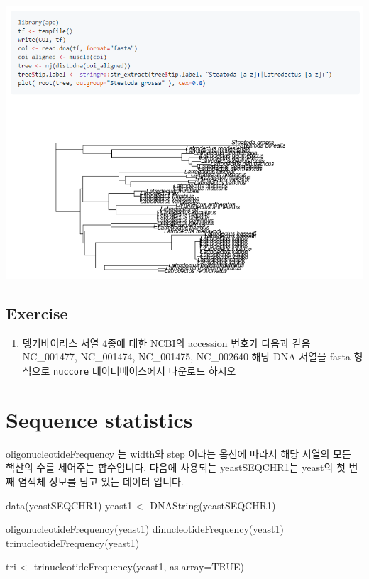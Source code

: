 \documentclass[
]{book}
\newenvironment{Shaded}{\begin{snugshade}}{\end{snugshade}}
\newcommand{\AttributeTok}[1]{\textcolor[rgb]{0.77,0.63,0.00}{#1}}
\newcommand{\ConstantTok}[1]{\textcolor[rgb]{0.00,0.00,0.00}{#1}}
\newcommand{\FunctionTok}[1]{\textcolor[rgb]{0.00,0.00,0.00}{#1}}
\newcommand{\NormalTok}[1]{#1}
\newcommand{\OtherTok}[1]{\textcolor[rgb]{0.56,0.35,0.01}{#1}}
\providecommand{\tightlist}{%
  \setlength{\itemsep}{0pt}\setlength{\parskip}{0pt}}
\begin{document}
\includegraphics{images/ape.PNG}

\hypertarget{exercise-7}{%
\subsection{Exercise}\label{exercise-7}}

\begin{enumerate}
\def\labelenumi{\arabic{enumi}.}
\tightlist
\item
  뎅기바이러스 서열 4종에 대한 NCBI의 accession 번호가 다음과 같음 NC\_001477, NC\_001474, NC\_001475, NC\_002640 해당 DNA 서열을 fasta 형식으로 \texttt{nuccore} 데이터베이스에서 다운로드 하시오
\end{enumerate}

\hypertarget{sequence-statistics}{%
\section{Sequence statistics}\label{sequence-statistics}}

oligonucleotideFrequency 는 width와 step 이라는 옵션에 따라서 해당 서열의 모든 핵산의 수를 세어주는 합수입니다. 다음에 사용되는 yeastSEQCHR1는 yeast의 첫 번째 염색체 정보를 담고 있는 데이터 입니다.

\begin{Shaded}
\begin{Highlighting}[]
\FunctionTok{data}\NormalTok{(yeastSEQCHR1)}
\NormalTok{yeast1 }\OtherTok{\textless{}{-}} \FunctionTok{DNAString}\NormalTok{(yeastSEQCHR1)}

\FunctionTok{oligonucleotideFrequency}\NormalTok{(yeast1)}
\FunctionTok{dinucleotideFrequency}\NormalTok{(yeast1)}
\FunctionTok{trinucleotideFrequency}\NormalTok{(yeast1)}

\NormalTok{tri }\OtherTok{\textless{}{-}} \FunctionTok{trinucleotideFrequency}\NormalTok{(yeast1, }\AttributeTok{as.array=}\ConstantTok{TRUE}\NormalTok{)}
\end{Highlighting}
\end{Shaded}
\end{document}
